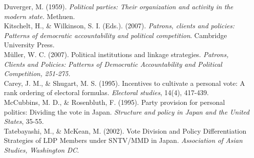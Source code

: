 \documentclass{article}
\begin{document}
\\
\\
\\
\\
\\
\\
\\
\\
\\
\\
\\
\\
\\
\\
\\
\\
\\
\\
\\
\\
\\
\\
\\
\\
\\
\\
\\







Duverger, M. (1959). \textit{Political parties: Their organization and activity in the modern state.} Methuen.\\

Kitschelt, H., \& Wilkinson, S. I. (Eds.). (2007). \textit{Patrons, clients and policies: Patterns of democratic accountability and political competition}. Cambridge University Press.\\

M\"uller, W. C. (2007). Political institutions and linkage strategies. \textit{Patrons, Clients and Policies: Patterns of Democratic Accountability and Political Competition, 251-275.}\\

Carey, J. M., & Shugart, M. S. (1995). Incentives to cultivate a personal vote: A rank ordering of electoral formulas. \textit{Electoral studies}, 14(4), 417-439.\\

McCubbins, M. D., & Rosenbluth, F. (1995). Party provision for personal politics: Dividing the vote in Japan. \textit{Structure and policy in Japan and the United States}, 35-55.\\

Tatebayashi, M., & McKean, M. (2002). Vote Division and Policy Differentiation Strategies of LDP Members under SNTV/MMD in Japan. \textit{Association of Asian Studies, Washington DC}.\\
\end{document}
